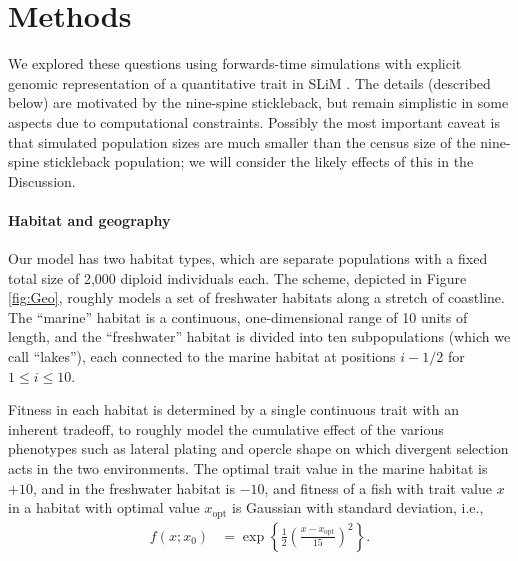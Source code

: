 \documentclass{article}
\newcommand{\plr}[1]{\todo[linecolor=blue,backgroundcolor=blue!25,bordercolor=blue]{#1}}
\begin{document}
\section{Methods}

We explored these questions
using forwards-time simulations with explicit genomic representation of a quantitative trait
in SLiM \citep{haller2017slim}.
The details (described below) are motivated by the nine-spine stickleback,
but remain simplistic in some aspects due to computational constraints.
Possibly the most important caveat is that simulated population sizes are much smaller
than the census size of the nine-spine stickleback population;
we will consider the likely effects of this in the Discussion.
\plr{TODO}


\paragraph{Habitat and geography}
Our model has two habitat types, which are separate populations
with a fixed total size of 2,000 diploid individuals each.
The scheme, depicted in Figure \ref{fig:Geo},
roughly models a set of freshwater habitats
along a stretch of coastline.
The ``marine'' habitat  is a continuous, one-dimensional range of 10 units of length,
and the ``freshwater'' habitat is divided into ten subpopulations
(which we call ``lakes''), each connected to the marine habitat
at positions $i - 1/2$ for $1 \le i \le 10$.

Fitness in each habitat is determined by a single continuous trait with an inherent tradeoff,
to roughly model the cumulative effect of the various phenotypes
such as lateral plating and opercle shape
on which divergent selection acts in the two environments.
The optimal trait value in the marine habitat is $+10$,
and in the freshwater habitat is $-10$,
and fitness of a fish with trait value $x$ in a habitat with optimal value $x_\text{opt}$ is
Gaussian with standard deviation, i.e.,
\begin{align*}
    f(x; x_0)
    &=
    \exp\left\{
        \frac{1}{2}
            \left(
            \frac{x-x_\text{opt}}{15}
            \right)^2
        \right\} .
\end{align*}
\end{document}
